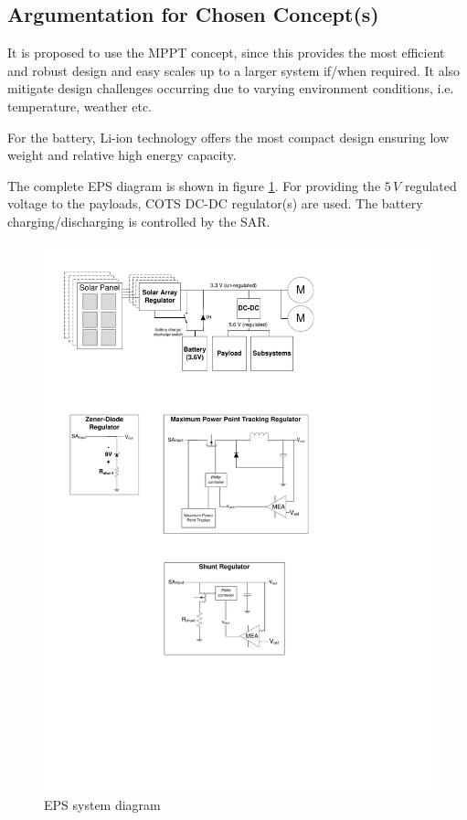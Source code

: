 \subsection{Argumentation for Chosen Concept(s)}
%
It is proposed to use the \ac{MPPT} concept, since this provides the most efficient and robust design and easy scales up to a larger system if/when required. It also mitigate design challenges occurring due to varying environment conditions, i.e. temperature, weather etc.

For the battery, Li-ion technology offers the most compact design ensuring low weight and relative high energy capacity.

The complete \ac{EPS} diagram is shown in figure \ref{fig:EPSdiagram}. For providing the $5\,V$ regulated voltage to the payloads, \ac{COTS} DC-DC regulator(s) are used. The battery charging/discharging is controlled by the \ac{SAR}.
%
\begin{figure}[H]
\centering
\includegraphics[scale=1]{figures/fig_PDR_EPSdiagram}
\caption{\ac{EPS} system diagram}
\label{fig:EPSdiagram}
\end{figure}
%
%
